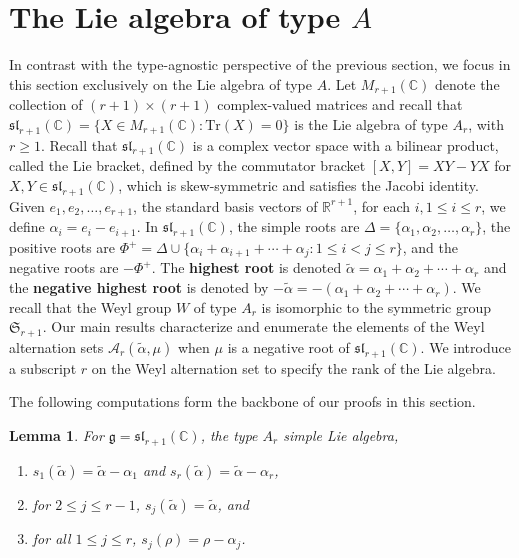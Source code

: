 \documentclass{amsart}
\newtheorem{lemma}[theorem]{Lemma}
\theoremstyle{definition}
\newcommand{\hroot}{\tilde{\alpha}}
\newcommand{\calA}{\mathcal{A}}
\newcommand*{\C}{\mathbb{C}}
\newcommand*{\R}{\mathbb{R}}
\newcommand{\defn}[1]{\textbf{#1}}
\begin{document}
\section{The Lie algebra of type \texorpdfstring{$A$}{A}}\label{sec:NegAlpha}

In contrast with the type-agnostic perspective of the previous section, we focus in this section exclusively on the Lie algebra of type $A$.
Let $M_{r+1}(\C)$ denote the collection of $(r+1)\times (r+1)$ 
complex-valued matrices and recall that $\mathfrak{sl}_{r+1}(\C) = \{X \in M_{r+1}(\C): \text{Tr}(X) = 0\}$ is the Lie algebra of type $A_r$, with $r\geq 1$.
Recall that $\mathfrak{sl}_{r+1}(\C)$
is a complex vector space with a bilinear product, called the Lie bracket, defined by the commutator bracket $[X,Y]=XY-YX$ for $X,Y\in\mathfrak{sl}_{r+1}(\C)$, which is skew-symmetric and satisfies the Jacobi identity. 
Given $e_1,e_2,\ldots,e_{r+1}$, the standard basis vectors of $\R^{r+1}$, for each $i, 1 \le i \le r$, we define
$\alpha_i = e_i - e_{i+1}$.
In $\mathfrak{sl}_{r+1}(\C)$,
 the simple roots are $\Delta=\{\alpha_1,\alpha_2,\ldots,\alpha_r\}$, 
the positive roots are 
$\Phi^+=\Delta \cup \{\alpha_i+\alpha_{i+1}+\cdots+\alpha_j:1\leq i<j\leq r\}$,
and the negative roots are $-\Phi^+$. 
The \defn{highest root} is denoted $\hroot=\alpha_1+\alpha_2+\cdots+\alpha_r$ and the \defn{negative highest root} is denoted by $-\hroot=-(\alpha_1+\alpha_2+\cdots+\alpha_r)$.
We recall that the Weyl group $W$ of type $A_r$ is isomorphic to the symmetric group $\mathfrak{S}_{r+1}$.
Our main results characterize and enumerate the elements of the Weyl alternation sets $\calA_r(\hroot,\mu)$ when $\mu$ is a negative root of $\mathfrak{sl}_{r+1}(\mathbb{C})$. 
We introduce a subscript $r$ on the Weyl alternation set to specify the rank of the Lie algebra.

The following computations form the backbone of our proofs in this section. 

\begin{lemma}\label{lem:SmallerComputation}
For $\mathfrak{g}=\mathfrak{sl}_{r+1}(\C)$, the type $A_r$ simple Lie algebra,
\begin{enumerate}
\item $s_1(\tilde{\alpha}) = \tilde{\alpha} - \alpha_1$ and $s_r(\tilde{\alpha}) = \tilde{\alpha} - \alpha_r$,
\item for $2 \leq j \leq r-1$, $s_j(\tilde{\alpha}) = \tilde{\alpha}$, and
\item for all $1 \leq j \leq r$, $s_j(\rho) = \rho - \alpha_j$.
\end{enumerate}    
\end{lemma}
\end{document}
